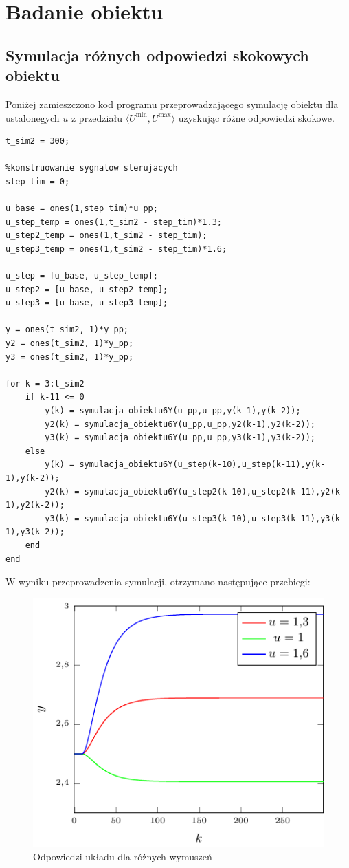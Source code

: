 \chapter{Badanie obiektu}
\section{Symulacja różnych odpowiedzi skokowych obiektu}

Poniżej zamieszczono kod programu przeprowadzającego symulację obiektu dla ustalonegych $u$  z przedziału $ \langle  U^{\textrm{min}}, U^{\textrm{max}}\rangle $ uzyskując różne odpowiedzi skokowe. 

\begin{lstlisting}[style=Matlab-editor, basicstyle=\tiny]
t_sim2 = 300;

%konstruowanie sygnalow sterujacych
step_tim = 0;

u_base = ones(1,step_tim)*u_pp;
u_step_temp = ones(1,t_sim2 - step_tim)*1.3;
u_step2_temp = ones(1,t_sim2 - step_tim);
u_step3_temp = ones(1,t_sim2 - step_tim)*1.6;

u_step = [u_base, u_step_temp];
u_step2 = [u_base, u_step2_temp];
u_step3 = [u_base, u_step3_temp];

y = ones(t_sim2, 1)*y_pp;
y2 = ones(t_sim2, 1)*y_pp;
y3 = ones(t_sim2, 1)*y_pp;

for k = 3:t_sim2
    if k-11 <= 0
        y(k) = symulacja_obiektu6Y(u_pp,u_pp,y(k-1),y(k-2));
        y2(k) = symulacja_obiektu6Y(u_pp,u_pp,y2(k-1),y2(k-2));
        y3(k) = symulacja_obiektu6Y(u_pp,u_pp,y3(k-1),y3(k-2));
    else
        y(k) = symulacja_obiektu6Y(u_step(k-10),u_step(k-11),y(k-1),y(k-2));
        y2(k) = symulacja_obiektu6Y(u_step2(k-10),u_step2(k-11),y2(k-1),y2(k-2));
        y3(k) = symulacja_obiektu6Y(u_step3(k-10),u_step3(k-11),y3(k-1),y3(k-2));      
    end
end
\end{lstlisting}

W wyniku przeprowadzenia symulacji, otrzymano następujące przebiegi:
\begin{figure}[h] 
\centering 
\includegraphics[scale=1.4]{wykresy/zad1_2/2_1.pdf} 
\caption{Odpowiedzi układu dla różnych wymuszeń} 
\end{figure}

